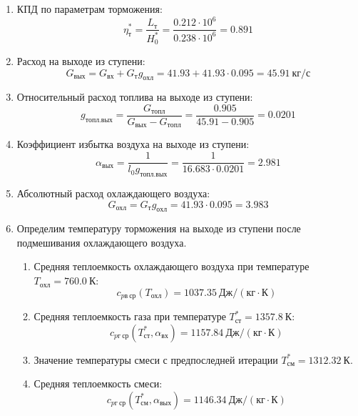 \documentclass[a4paper,12pt]{article}
\begin{document}
\begin{enumerate}
        \item КПД по параметрам торможения:
        \[
            \eta_т^* = \frac{ L_т }{ H_0^* } =
                \frac{
                    0.212 \cdot 10^6
                }{
                    0.238 \cdot 10^6 } =
            0.891
        \]

        \item Расход на выходе из ступени:
        \[
            G_{вых} = G_{вх} + G_т g_{охл} =
                41.93 + 41.93 \cdot
                0.095 =
            45.91 \ кг/с
        \]

        \item Относительный расход топлива на выходе из ступени:
        \[
            g_{топл.вых} = \frac{ G_{топл} }{ G_{вых} - G_{топл} } =
                 \frac{ 0.905 }{ 45.91 - 0.905 } =
            0.0201
        \]

        \item Коэффициент избытка воздуха на выходе из ступени:
        \[
            \alpha_{вых} = \frac{ 1 }{ l_0 g_{топл.вых} } =
                \frac{ 1 }{ 16.683 \cdot 0.0201 } =
            2.981
        \]

        \item Абсолютный расход охлаждающего воздуха:
        \[
            G_{охл} = G_т g_{охл} = 41.93 \cdot 0.095 =
            3.983
        \]

        \item Определим температуру торможения на выходе из ступени после подмешивания охлаждающего воздуха.
        \begin{enumerate}

            \item Средняя теплоемкость охлаждающего воздуха при температуре $T_{охл} = 760.0\ К $:
            \[
                c_{pв\ ср} (T_{охл}) = 1037.35\ Дж/ (кг \cdot К)
            \]

            \item Средняя теплоемкость газа при температуре $T_{ст}^* = 1357.8 \ К $:
            \[
                c_{pг\ ср} (T_{ст}^*, \alpha_{вх}) =
                1157.84\ Дж/ (кг \cdot К)
            \]

            \item Значение температуры смеси с предпоследней итерации $T_{см}^{*} = 1312.32\ К$.

            \item Средняя теплоемкость смеси:
            \[
                c_{pг\ ср} (T_{см}^{*}, \alpha_{вых}) =
                1146.34\ Дж/ (кг \cdot К)
            \]


\end{enumerate}
\end{enumerate}
\end{document}
